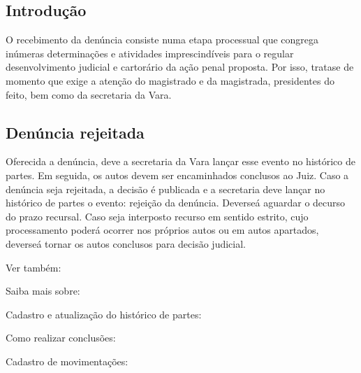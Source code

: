 \documentclass[letterpaper,10pt,brazil]{sphinxmanual}
\begin{document}
\subsection{Introdução}
\label{\detokenize{02analisedenuncia:introducao}}
\sphinxAtStartPar
O recebimento da denúncia consiste numa etapa processual que congrega inúmeras determinações e atividades imprescindíveis para o regular desenvolvimento judicial e cartorário da ação penal proposta.
Por isso, trata\sphinxhyphen{}se de momento que exige a atenção do magistrado e da magistrada, presidentes do feito, bem como da secretaria da Vara.


\subsection{Denúncia rejeitada}
\label{\detokenize{02analisedenuncia:denuncia-rejeitada}}
\sphinxAtStartPar
Oferecida a denúncia, deve a secretaria da Vara lançar esse evento no histórico de partes.
Em seguida, os autos devem ser encaminhados conclusos ao Juiz.
Caso a denúncia seja rejeitada, a decisão é publicada e a secretaria deve lançar no histórico de partes o evento: rejeição da denúncia.
Dever\sphinxhyphen{}se\sphinxhyphen{}á aguardar o decurso do prazo recursal.
Caso seja interposto recurso em sentido estrito, cujo processamento poderá ocorrer nos próprios autos ou em autos apartados, dever\sphinxhyphen{}se\sphinxhyphen{}á tornar os autos conclusos para decisão judicial.


\begin{sphinxseealso}{Ver também:}

\sphinxAtStartPar
Saiba mais sobre:

\sphinxAtStartPar
Cadastro e atualização do histórico de partes: {\hyperref[\detokenize{projud_23_cadastroparte::doc}]{}}

\sphinxAtStartPar
Como realizar conclusões: {\hyperref[\detokenize{projud_35_enviarconcluso::doc}]{}}

\sphinxAtStartPar
Cadastro de movimentações: {\hyperref[\detokenize{projud_11_telainicialprocesso::doc}]{}}


\end{sphinxseealso}
\end{document}
